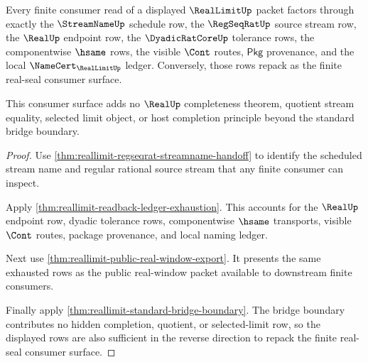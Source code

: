 \begin{theorem}
\label{thm:reallimit-finite-real-seal-consumer-completeness}
Every finite consumer read of a displayed $\RealLimitUp$ packet factors through
exactly the $\StreamNameUp$ schedule row, the $\RegSeqRatUp$ source stream row,
the $\RealUp$ endpoint row, the $\DyadicRatCoreUp$ tolerance rows, the
componentwise $\hsame$ rows, the visible $\Cont$ routes, $\mathsf{Pkg}$
provenance, and the local $\NameCert_{\RealLimitUp}$ ledger. Conversely, those
rows repack as the finite real-seal consumer surface.

This consumer surface adds no $\RealUp$ completeness theorem, quotient stream
equality, selected limit object, or host completion principle beyond the
standard bridge boundary.
\end{theorem}
\begin{proof}
Use \autoref{thm:reallimit-regseqrat-streamname-handoff} to identify the
scheduled stream name and regular rational source stream that any finite
consumer can inspect.

Apply \autoref{thm:reallimit-readback-ledger-exhaustion}. This accounts for the
$\RealUp$ endpoint row, dyadic tolerance rows, componentwise $\hsame$
transports, visible $\Cont$ routes, package provenance, and local naming ledger.

Next use \autoref{thm:reallimit-public-real-window-export}. It presents the
same exhausted rows as the public real-window packet available to downstream
finite consumers.

Finally apply \autoref{thm:reallimit-standard-bridge-boundary}. The bridge
boundary contributes no hidden completion, quotient, or selected-limit row, so
the displayed rows are also sufficient in the reverse direction to repack the
finite real-seal consumer surface.
\end{proof}

